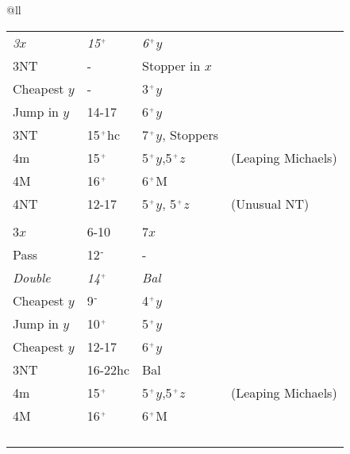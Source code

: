 \documentclass[10pt]{article}
\newcommand{\notrump}{NT}
\newcommand{\minor}{m}
\newcommand{\major}{M}
\newcommand{\hcp}{hc}
\newcommand{\balanced}{Bal}
\newcommand{\pass}{Pass}
\newcommand{\double}{Double}
\newcommand{\cheapest}{Cheapest }
\newcommand{\jump}{Jump in }
\newcommand{\bid}[4]{ #1 & #2 & #3 & #4 \\}
\newcommand{\forcebid}[4]{\bid{\textit{#1}}{\textit{#2}}{\textit{#3}}{\textit{#4}}}
\newcommand{\opponent}[4]{\bid{\color{OpponentBid}#1}{\color{OpponentBid}#2}{\color{OpponentBid}#3}{\color{OpponentBid}#4}}
\newcommand{\bidblock}[1]{\\ [-1.75ex] #1 \hline}
\newcommand{\response}{\hspace{1.0em}}
\newcommand{\overcall}{\hspace{0.65em}}
\newcommand{\ormore}{\ensuremath{^{\mbox{\tiny{+}}}}}
\newcommand{\orless}{\ensuremath{^{\mbox{\small{-}}}}}
\begin{document}
\begin{table}[htbp]
\begin{tabular*}{\textwidth}{@{\extracolsep{-1cm}}ll}
{{\begin{minipage}{0.5\textwidth}
\begin{tabular}{llll}
\overcall\forcebid{3$x$}{15\ormore}{6\ormore$y$}{} %
\overcall\response\bid{3\notrump}{-}{Stopper in $x$}{}
\overcall\response\bid{\cheapest$y$}{-}{3\ormore$y$}{}

\overcall\bid{\jump$y$}{14-17}{6\ormore$y$}{}
\overcall\bid{3\notrump}{15\ormore\hcp}{7\ormore$y$, Stoppers}{}
\overcall\bid{4\minor}{15\ormore}{5\ormore$y$,5\ormore$z$}{(Leaping Michaels)}
\overcall\bid{4\major}{16\ormore}{6\ormore\major}{}
\overcall\bid{4\notrump}{12-17}{5\ormore$y$, 5\ormore$z$}{(Unusual NT)}

\bidblock{\opponent{3$x$}{6-10}{7$x$}{}}
\overcall\bid{\pass}{12\orless}{-}{}
\overcall\forcebid{\double}{14\ormore}{\balanced}{}
\overcall\response\bid{\cheapest$y$}{9\orless}{4\ormore$y$}{}
\overcall\response\bid{\jump$y$}{10\ormore}{5\ormore$y$}{}

\overcall\bid{\cheapest$y$}{12-17}{6\ormore$y$}{}

\overcall\bid{3\notrump}{16-22\hcp}{\balanced}{}

\overcall\bid{4\minor}{15\ormore}{5\ormore$y$,5\ormore$z$}{(Leaping Michaels)}
\overcall\bid{4\major}{16\ormore}{6\ormore\major}{}
\\ \\ \\ \\


\end{tabular}

\end{minipage}
}}

\end{tabular*}

\end{table}

\pagebreak
\end{document}
